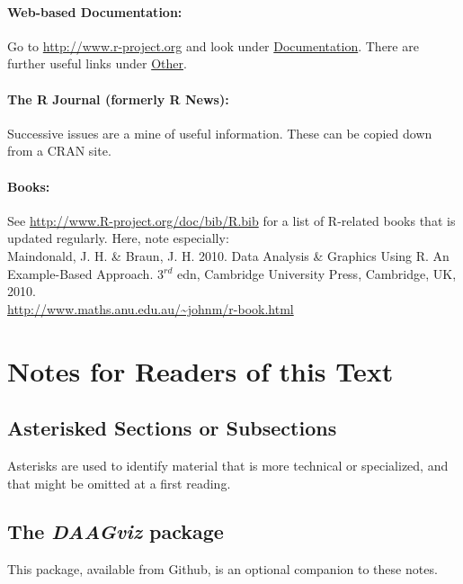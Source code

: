 \documentclass{tufte-book}\usepackage[]{graphicx}\usepackage[]{color}
\begin{document}
\paragraph{Web-based Documentation:}

Go to \url{http://www.r-project.org}
and look under \underline{Documentation}.
There are further useful links under \underline{Other}.

\paragraph{The R Journal (formerly R News):}
Successive issues are a mine of useful information.
These can be copied down from a CRAN site.

\paragraph{Books:}
See \url{http://www.R-project.org/doc/bib/R.bib} for a list of
R-related books that is updated regularly. Here, note
especially:\\[3pt]
\noindent
Maindonald, J. H. \& Braun, J. H. 2010. Data Analysis \&
  Graphics Using R. An Example-Based Approach. 3$^{rd}$ edn, Cambridge
  University Press,
  Cambridge, UK, 2010.\\
\noindent
\url{http://www.maths.anu.edu.au/~johnm/r-book.html}

\cleardoublepage
\section*{Notes for Readers of this Text}

\subsection*{Asterisked Sections or Subsections}

Asterisks are used to identify material that is more technical or
specialized, and that might be omitted at a first reading.

\subsection*{The {\em DAAGviz} package}
This package, available from Github, is an optional companion
to these notes. 
\end{document}

